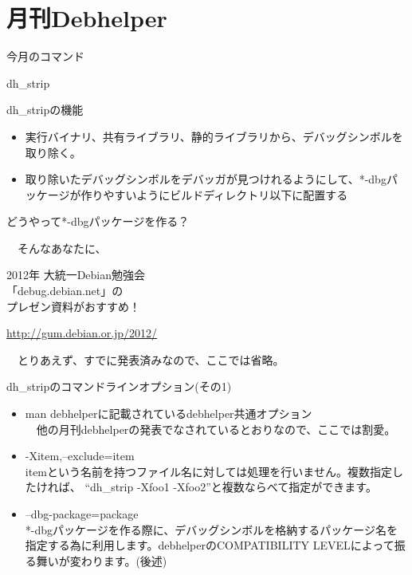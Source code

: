 \section{月刊Debhelper}
\begin{frame}{今月のコマンド}
\begin{center}
\Huge
 dh\_strip
\end{center}
\end{frame}

\begin{frame}{dh\_stripの機能}

\begin{itemize}
\item 実行バイナリ、共有ライブラリ、静的ライブラリから、デバッグシンボルを取り除く。
\item 取り除いたデバッグシンボルをデバッガが見つけれるようにして、*-dbgパッケージが作りやすいようにビルドディレクトリ以下に配置する
\end{itemize}

\end{frame}

\begin{frame}{どうやって*-dbgパッケージを作る？}

　そんなあなたに、\\
\begin{center}
\LARGE
2012年 大統一Debian勉強会\\
「debug.debian.net」の\\
プレゼン資料がおすすめ！
\end{center}
\begin{center}
\url{http://gum.debian.or.jp/2012/}
\end{center}

　とりあえず、すでに発表済みなので、ここでは省略。

\end{frame}

\begin{frame}{dh\_stripのコマンドラインオプション(その1)}

\begin{itemize}
\item man debhelperに記載されているdebhelper共通オプション\\
　他の月刊debhelperの発表でなされているとおりなので、ここでは割愛。
\item -Xitem,--exclude=item \\
  itemという名前を持つファイル名に対しては処理を行いません。複数指定したければ、
``dh\_strip -Xfoo1 -Xfoo2''と複数ならべて指定ができます。
\item --dbg-package=package \\
*-dbgパッケージを作る際に、デバッグシンボルを格納するパッケージ名を指定する為に利用します。debhelperのCOMPATIBILITY LEVELによって振る舞いが変わります。(後述)
\end{itemize}

\end{frame}

